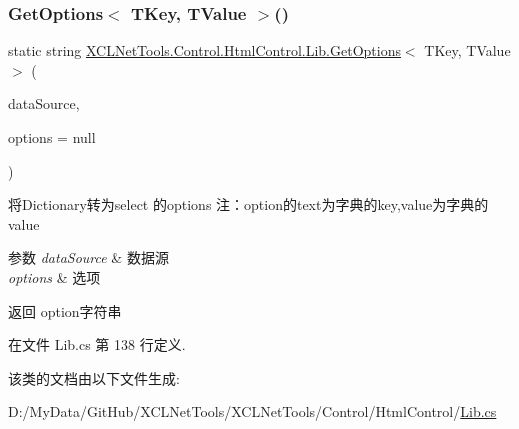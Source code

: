 \subsubsection{\texorpdfstring{Get\+Options$<$ T\+Key, T\+Value $>$()}{GetOptions< TKey, TValue >()}}
{\footnotesize\ttfamily static string \hyperlink{class_x_c_l_net_tools_1_1_control_1_1_html_control_1_1_lib_a6bc535ff27a3e67b2c4dac1d5e99aa8c}{X\+C\+L\+Net\+Tools.\+Control.\+Html\+Control.\+Lib.\+Get\+Options}$<$ T\+Key, T\+Value $>$ (\begin{DoxyParamCaption}\item[{Dictionary$<$ T\+Key, T\+Value $>$}]{data\+Source,  }\item[{\hyperlink{class_x_c_l_net_tools_1_1_entity_1_1_set_option_entity}{Set\+Option\+Entity}}]{options = {\ttfamily null} }\end{DoxyParamCaption})\hspace{0.3cm}{\ttfamily [static]}}



将\+Dictionary转为select 的options 注：option的text为字典的key,value为字典的value 


\begin{DoxyParams}{参数}
{\em data\+Source} & 数据源\\
\hline
{\em options} & 选项\\
\hline
\end{DoxyParams}
\begin{DoxyReturn}{返回}
option字符串
\end{DoxyReturn}


在文件 Lib.\+cs 第 138 行定义.



该类的文档由以下文件生成\+:\begin{DoxyCompactItemize}
\item 
D\+:/\+My\+Data/\+Git\+Hub/\+X\+C\+L\+Net\+Tools/\+X\+C\+L\+Net\+Tools/\+Control/\+Html\+Control/\hyperlink{_control_2_html_control_2_lib_8cs}{Lib.\+cs}\end{DoxyCompactItemize}
